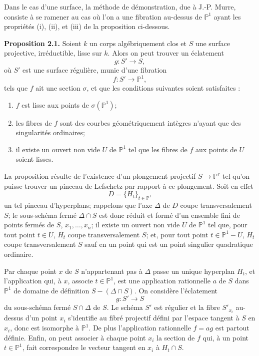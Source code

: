 \documentclass[11pt]{article}
\begin{document}
Dans le cas d'une surface, la méthode de démonstration, due à J.-P. Murre, consiste à se ramener au cas où l'on a une fibration au-dessus de $\mathbb P^1$ ayant les propriétés (i), (ii), et (iii) de la proposition ci-dessous.

\textbf{Proposition 2.1.} Soient $k$ un corps algébriquement clos et $S$ une surface projective, irréductible, lisse sur $k$. Alors on peut trouver un éclatement
\[
 g:S'\longrightarrow S,
\]
où $S'$ est une surface régulière, munie d'une fibration
\[
 f:S'\longrightarrow \mathbb P^1,
\]
tels que $f$ ait une section $\sigma$, et que les conditions suivantes soient satisfaites :
\begin{enumerate}[label=\textup{(\roman*)}]
\item $f$ est lisse aux points de $\sigma(\mathbb P^1)$;
\item les fibres de $f$ sont des courbes géométriquement intègres n'ayant que des singularités ordinaires;
\item il existe un ouvert non vide $U$ de $\mathbb P^1$ tel que les fibres de $f$ aux points de $U$ soient lisses.
\end{enumerate}

La proposition résulte de l'existence d'un plongement projectif $S\to\mathbb P^r$ tel qu'on puisse trouver un pinceau de Lefschetz par rapport à ce plongement. Soit en effet
\[
 D=\{H_t\}_{t\in\mathbb P^1}
\]
un tel pinceau d'hyperplans; rappelons que l'axe $\Delta$ de $D$ coupe transversalement $S$; le sous-schéma fermé $\Delta\cap S$ est donc réduit et formé d'un ensemble fini de points fermés de $S$, $x_1,\ldots,x_n$; il existe un ouvert non vide $U$ de $\mathbb P^1$ tel que, pour tout point $t\in U$, $H_t$ coupe transversalement $S$; et, pour tout point $t\in\mathbb P^1-U$, $H_t$ coupe transversalement $S$ sauf en un point qui est un point singulier quadratique ordinaire.

Par chaque point $x$ de $S$ n'appartenant pas à $\Delta$ passe un unique hyperplan $H_t$, et l'application qui, à $x$, associe $t\in\mathbb P^1$, est une application rationnelle $a$ de $S$ dans $\mathbb P^1$ de domaine de définition $S-(\Delta\cap S)$. On considère l'éclatement
\[
 g:S'\longrightarrow S
\]
du sous-schéma fermé $S\cap\Delta$ de $S$. Le schéma $S'$ est régulier et la fibre $S'_{x_i}$ au-dessus d'un point $x_i$ s'identifie au fibré projectif défini par l'espace tangent à $S$ en $x_i$, donc est isomorphe à $\mathbb P^1$. De plus l'application rationnelle $f=ag$ est partout définie. Enfin, on peut associer à chaque point $x_i$ la section de $f$ qui, à un point $t\in\mathbb P^1$, fait correspondre le vecteur tangent en $x_i$ à $H_t\cap S$.
\end{document}
